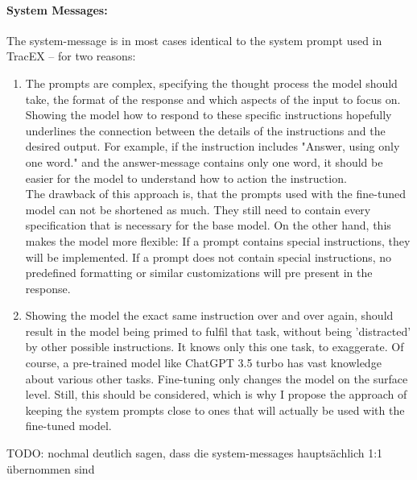 \paragraph{System Messages:} The system-message is in most cases identical to the system prompt used in TracEX – for two reasons:
\begin{enumerate}
    \item
        The prompts are complex, specifying the thought process the model should take, the format of the response and which aspects of the input to focus on. Showing the model how to respond to these specific instructions hopefully underlines the connection between the details of the instructions and the desired output. For example, if the instruction includes "Answer, using only one word." and the answer-message contains only one word, it should be easier for the model to understand how to action the instruction.\\
        The drawback of this approach is, that the prompts used with the fine-tuned model can not be shortened as much. They still need to contain every specification that is necessary for the base model. On the other hand, this makes the model more flexible: If a prompt contains special instructions, they will be implemented. If a prompt does not contain special instructions, no predefined formatting or similar customizations will pre present in the response.
    \item 
        Showing the model the exact same instruction over and over again, should result in the model being primed to fulfil that task, without being 'distracted' by other possible instructions. It knows only this one task, to exaggerate. Of course, a pre-trained model like ChatGPT 3.5 turbo has vast knowledge about various other tasks. Fine-tuning only changes the model on the surface level. Still, this should be considered, which is why I propose the approach of keeping the system prompts close to ones that will actually be used with the fine-tuned model.
\end{enumerate}
TODO: nochmal deutlich sagen, dass die system-messages hauptsächlich 1:1 übernommen sind


